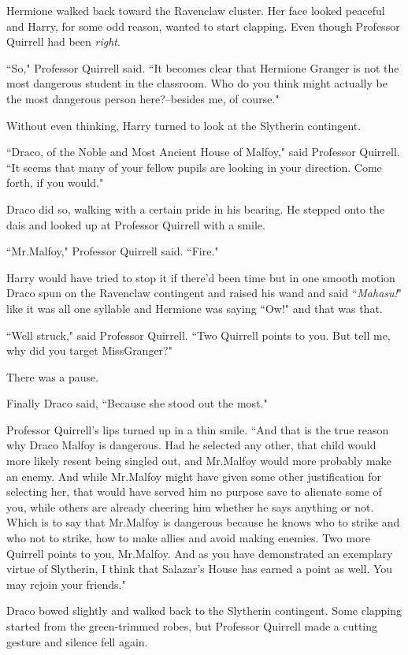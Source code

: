 Hermione walked back toward the Ravenclaw cluster. Her face looked peaceful and Harry, for some odd reason, wanted to start clapping. Even though Professor Quirrell had been \emph{right}.

``So," Professor Quirrell said. ``It becomes clear that Hermione Granger is not the most dangerous student in the classroom. Who do you think might actually be the most dangerous person here?\---besides me, of course."

Without even thinking, Harry turned to look at the Slytherin contingent.

``Draco, of the Noble and Most Ancient House of Malfoy," said Professor Quirrell. ``It seems that many of your fellow pupils are looking in your direction. Come forth, if you would."

Draco did so, walking with a certain pride in his bearing. He stepped onto the dais and looked up at Professor Quirrell with a smile.

``Mr.\?Malfoy," Professor Quirrell said. ``Fire."

Harry would have tried to stop it if there'd been time but in one smooth motion Draco spun on the Ravenclaw contingent and raised his wand and said ``\emph{Mahasu!}" like it was all one syllable and Hermione was saying ``Ow!" and that was that.

``Well struck," said Professor Quirrell. ``Two Quirrell points to you. But tell me, why did you target Miss\?Granger?"

There was a pause.

Finally Draco said, ``Because she stood out the most."

Professor Quirrell's lips turned up in a thin smile. ``And that is the true reason why Draco Malfoy is dangerous. Had he selected any other, that child would more likely resent being singled out, and Mr.\?Malfoy would more probably make an enemy. And while Mr.\?Malfoy might have given some other justification for selecting her, that would have served him no purpose save to alienate some of you, while others are already cheering him whether he says anything or not. Which is to say that Mr.\?Malfoy is dangerous because he knows who to strike and who not to strike, how to make allies and avoid making enemies. Two more Quirrell points to you, Mr.\?Malfoy. And as you have demonstrated an exemplary virtue of Slytherin, I think that Salazar's House has earned a point as well. You may rejoin your friends."

Draco bowed slightly and walked back to the Slytherin contingent. Some clapping started from the green-trimmed robes, but Professor Quirrell made a cutting gesture and silence fell again.

